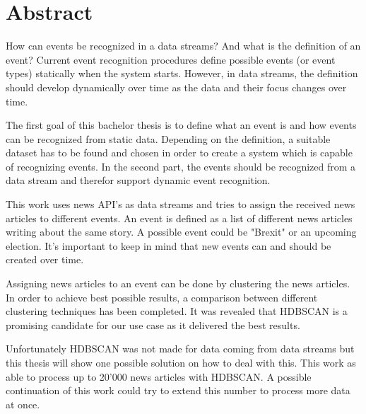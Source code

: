 
\section{Abstract}

How can events be recognized in a data streams?
And what is the definition of an event?
Current event recognition procedures define possible events (or event types) statically when the system starts.
However, in data streams, the definition should develop dynamically over time as the data and their focus changes over time.

The first goal of this bachelor thesis is to define what an event is and how events can be recognized from static data.
Depending on the definition, a suitable dataset has to be found and chosen in order to create a system
which is capable of recognizing events.
In the second part, the events should be recognized from a data stream and therefor support dynamic event recognition.

This work uses news API's as data streams and tries to assign the received news articles to different events.
An event is defined as a list of different news articles writing about the same story.
A possible event could be "Brexit" or an upcoming election.
It's important to keep in mind that new events can and should be created over time.

Assigning news articles to an event can be done by clustering the news articles.
In order to achieve best possible results, a comparison between different clustering techniques has been completed.
It was revealed that HDBSCAN is a promising candidate for our use case as it delivered the best results.

Unfortunately HDBSCAN was not made for data coming from data streams but this thesis will show
one possible solution on how to deal with this.
This work as able to process up to 20'000 news articles with HDBSCAN.
A possible continuation of this work could try to extend this number to process more data at once.
